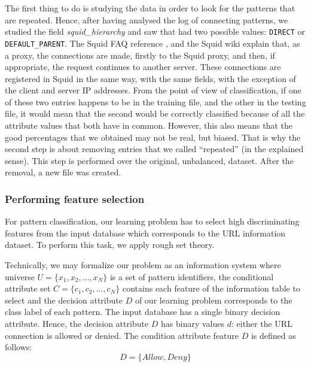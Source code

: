 \documentclass{llncs}
\begin{document}
The first thing to do is studying the data in order to look for the patterns that are repeated. Hence, after having analysed the log of connecting patterns, we studied the field \textit{squid\_hierarchy} and saw that had two possible values: \texttt{DIRECT} or \texttt{DEFAULT\_PARENT}. The Squid FAQ reference \cite{squid_logs}, and the Squid wiki \cite{squid_wiki} explain that, as a proxy, the connections are made, firstly to the Squid proxy, and then, if appropriate, the request continues to another server. These connections are registered in Squid in the same way, with the same fields, with the exception of the client and server IP addresses. From the point of view of classification, if one of these two entries happens to be in the training file, and the other in the testing file, it would mean that the second would be correctly classified because of all the attribute values that both have in common. However, this also means that the good percentages that we obtained may not be real, but biased. That is why the second step is about removing entries that we called ``repeated'' (in the explained sense). This step is performed over the original, unbalanced, dataset. After the removal, a new file was created.

%
\subsubsection{Performing feature selection}
\label{subsec:featselresults}

For pattern classification, our learning problem has to select high discriminating features from the input database which corresponds to the URL information dataset. To perform this task, we apply rough set theory.

Technically, we may formalize our problem as an information system where universe $U = \{x_1, x_2, \ldots, x_N\}$ is a set of pattern identifiers, the conditional attribute set $C =\{c_1,c_2, \ldots, c_N\}$ contains each feature of the information table to select and the decision attribute $D$ of our learning problem corresponds to the class label of each pattern. The input database has a single binary decision attribute. Hence, the decision attribute $D$  has binary values $d$:  either the URL connection is allowed   or denied. The condition attribute feature $D$ is defined as follows:
\begin{displaymath}
D =\{Allow, Deny\}
\end{displaymath}
\end{document}
